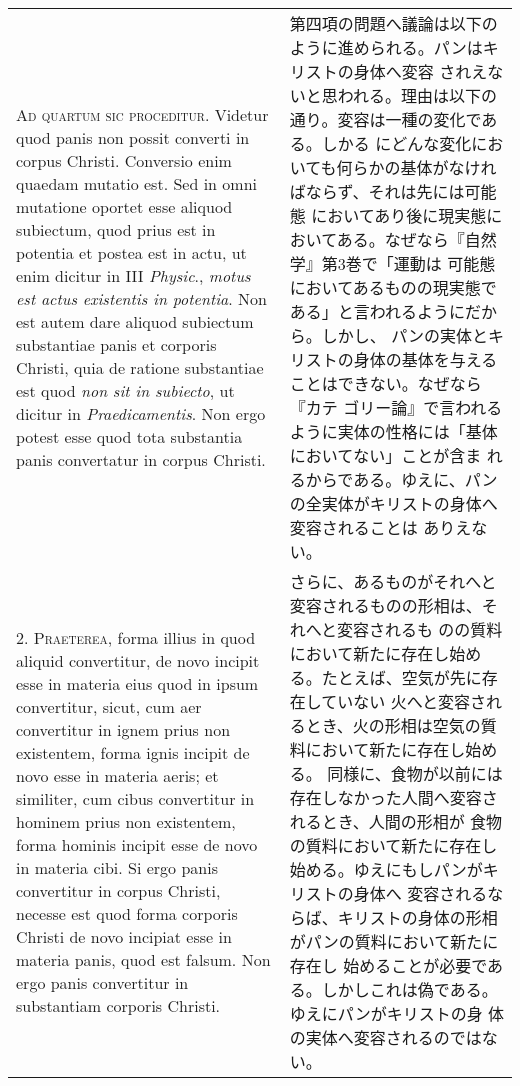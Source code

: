 \documentclass[10pt]{jsarticle} %
\begin{document}
\begin{longtable}{p{21em}p{21em}}

{\scshape Ad quartum sic proceditur}. Videtur quod panis non possit
converti in corpus Christi. Conversio enim quaedam mutatio est. Sed in
omni mutatione oportet esse aliquod subiectum, quod prius est in
potentia et postea est in actu, ut enim dicitur in III {\itshape
Physic}., {\itshape motus est actus existentis in potentia}. Non est
autem dare aliquod subiectum substantiae panis et corporis Christi,
quia de ratione substantiae est quod {\itshape non sit in subiecto},
ut dicitur in {\itshape Praedicamentis}. Non ergo potest esse quod
tota substantia panis convertatur in corpus Christi.

&

第四項の問題へ議論は以下のように進められる。パンはキリストの身体へ変容
されえないと思われる。理由は以下の通り。変容は一種の変化である。しかる
にどんな変化においても何らかの基体がなければならず、それは先には可能態
においてあり後に現実態においてある。なぜなら『自然学』第3巻で「運動は
可能態においてあるものの現実態である」と言われるようにだから。しかし、
パンの実体とキリストの身体の基体を与えることはできない。なぜなら『カテ
ゴリー論』で言われるように実体の性格には「基体においてない」ことが含ま
れるからである。ゆえに、パンの全実体がキリストの身体へ変容されることは
ありえない。

\\

2. {\scshape Praeterea}, forma illius in quod aliquid convertitur, de
novo incipit esse in materia eius quod in ipsum convertitur, sicut,
cum aer convertitur in ignem prius non existentem, forma ignis incipit
de novo esse in materia aeris; et similiter, cum cibus convertitur in
hominem prius non existentem, forma hominis incipit esse de novo in
materia cibi. Si ergo panis convertitur in corpus Christi, necesse est
quod forma corporis Christi de novo incipiat esse in materia panis,
quod est falsum. Non ergo panis convertitur in substantiam corporis
Christi.

&

さらに、あるものがそれへと変容されるものの形相は、それへと変容されるも
のの質料において新たに存在し始める。たとえば、空気が先に存在していない
火へと変容されるとき、火の形相は空気の質料において新たに存在し始める。
同様に、食物が以前には存在しなかった人間へ変容されるとき、人間の形相が
食物の質料において新たに存在し始める。ゆえにもしパンがキリストの身体へ
変容されるならば、キリストの身体の形相がパンの質料において新たに存在し
始めることが必要である。しかしこれは偽である。ゆえにパンがキリストの身
体の実体へ変容されるのではない。


\end{longtable}
\end{document}

